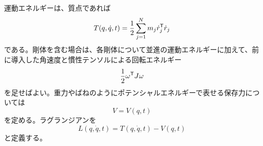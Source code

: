 運動エネルギーは、質点であれば
\begin{equation}
  T(q,\dot{q},t)
  =
  \frac{1}{2}
  \sum_{j=1}^N
  m_j\dot{r}_j^{\mathsf{T}}\dot{r}_j
\end{equation}
である。剛体を含む場合は、各剛体について並進の運動エネルギーに加えて、前に導入した角速度と慣性テンソルによる回転エネルギー
\begin{equation}
  \frac{1}{2}\omega^{\mathsf{T}} J\omega
\end{equation}
を足せばよい。重力やばねのようにポテンシャルエネルギーで表せる保存力については
\begin{equation}
  V=V(q,t)
\end{equation}
を定める。ラグランジアンを
\begin{equation}
  L(q,\dot{q},t)=T(q,\dot{q},t)-V(q,t)
\end{equation}
と定義する。


